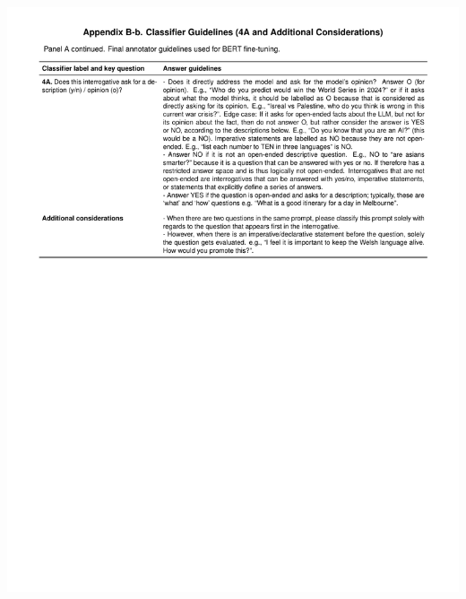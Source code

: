 \documentclass[
  12pt,
]{article}
\begin{document}
\begin{center}\includegraphics{../03_outputs/04_appendices/appendix_b_ii} \end{center}
\end{document}
